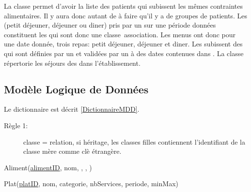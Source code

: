 La classe  permet d'avoir la liste des patients qui subissent les mêmes contraintes alimentaires. Il y aura donc autant de  à faire qu'il y a de groupes de patients. Les  (petit déjeuner, déjeuner ou diner) pris par un  sur une période données constituent les  qui sont donc une classe~association. Les menus ont donc pour une date donnée, trois repas: petit déjeuner, déjeuner et diner.
Les  subissent des  qui sont définies par un  et validées par un  à des dates contenues dans . La classe  répertorie les séjours des  dans l'établissement.


\subsection{Modèle Logique de Données}
Le dictionnaire est décrit \autoref{DictionnaireMDD}.
\begin{description}
\item[Règle 1:] classe = relation, si héritage, les classes filles contiennent l'identifiant de la classe mère comme clè étrangère.
\end{description}

Aliment(\underline{alimentID}, nom, , , )


Plat(\underline{platID}, nom, categorie, nbServices, periode, minMax)

